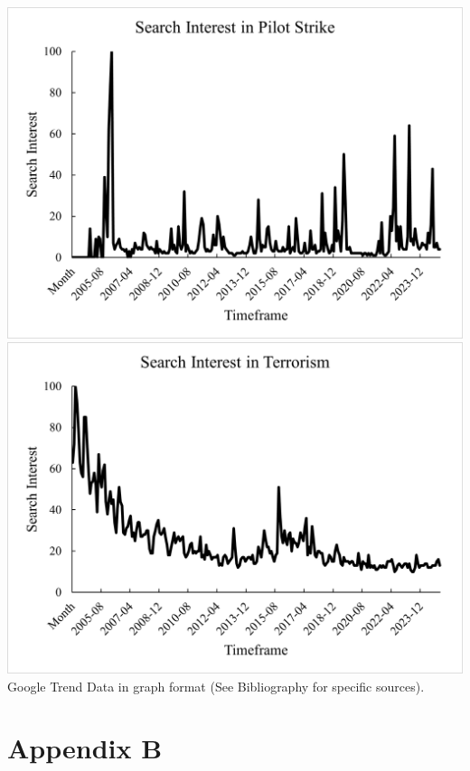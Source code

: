 \documentclass[12pt]{report}
\begin{document}
\includegraphics[scale=.6]{Picture4}\\
\includegraphics[scale=.6]{Picture5}\\
\tiny{Google Trend Data in graph format (See Bibliography for specific sources).}
\newpage
\section*{Appendix B}
\tiny
\setlength{\tabcolsep}{.1 cm}
\hspace*{-3cm}

\noindent
\end{document}
